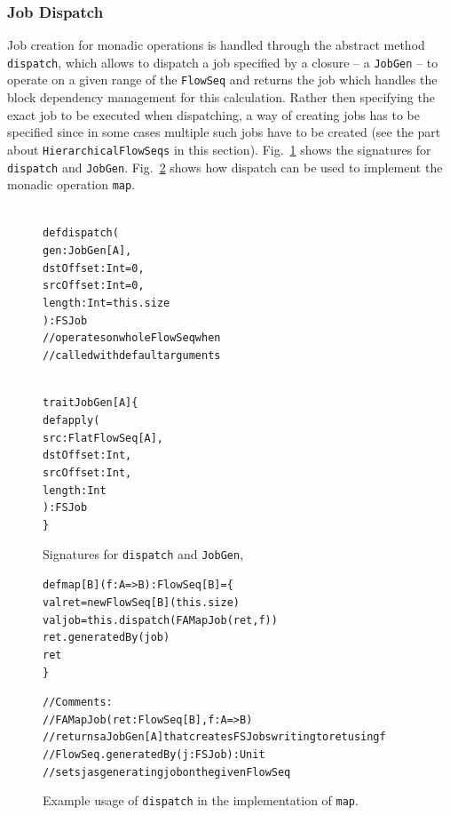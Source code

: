 \documentclass[runningheads,a4paper,fleqn]{llncs}
\begin{document}
\subsubsection{Job Dispatch}
Job creation for monadic operations is handled through the abstract
method \texttt{dispatch}, which allows to dispatch a job specified by
a closure -- a \texttt{JobGen} -- to operate on a given range of the
\texttt{FlowSeq} and returns the job which handles the block dependency
management for this calculation. Rather then specifying the exact job
to be executed when dispatching, a way of creating jobs has to be 
specified since in some cases multiple such jobs have to be created
(see the part about \texttt{HierarchicalFlowSeqs} in this
section). Fig.~\ref{fig:dispatch-code} shows the 
signatures for \texttt{dispatch} and
\texttt{JobGen}. Fig.~\ref{fig:dispatch-example} shows how dispatch
can be used to implement the monadic operation \texttt{map}.

\begin{figure}
\begin{minipage}[t]{6cm}
\begin{alltt}
{\scriptsize
def dispatch(
  gen: JobGen[A],
  dstOffset: Int = 0,
  srcOffset: Int = 0,
  length: Int = this.size
): FSJob
// operates on whole FlowSeq when
// called with default arguments
}
\end{alltt}
\end{minipage}
\begin{minipage}[t]{7cm}
\begin{alltt}
{\scriptsize
trait JobGen[A] \{
  def apply(
    src: FlatFlowSeq[A],
    dstOffset: Int,
    srcOffset: Int,
    length: Int
  ): FSJob
\}
}
\end{alltt}
\end{minipage}
\caption{Signatures for \texttt{dispatch} and \texttt{JobGen}, }
\label{fig:dispatch-code}
\end{figure}

\begin{figure}
\begin{alltt}
{\scriptsize
def map[B](f: A => B): FlowSeq[B] = \{
    val ret = newFlowSeq[B](this.size)
    val job = this.dispatch(FAMapJob(ret, f))
    ret.generatedBy(job)
    ret
\}

// Comments:
//  FAMapJob(ret: FlowSeq[B], f: A => B)
//    returns a JobGen[A] that creates FSJobs writing to ret using f
//  FlowSeq.generatedBy(j: FSJob): Unit
//    sets j as generating job on the given FlowSeq
}
\end{alltt}
\caption{Example usage of \texttt{dispatch} in the implementation of
  \texttt{map}.}
\label{fig:dispatch-example}
\end{figure}
\end{document}
